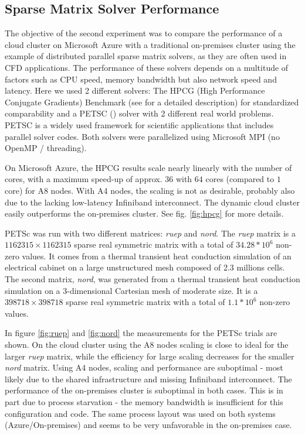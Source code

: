 \documentclass[3p,times]{elsarticle}
\begin{document}
\subsection{Sparse Matrix Solver Performance}
The objective of the second experiment was to compare the performance of a cloud cluster on Microsoft Azure with a traditional on-premises cluster using the example of distributed parallel sparse matrix solvers, as they are often used in CFD applications. The performance of these solvers depends on a multitude of factors such as CPU speed, memory bandwidth but also network speed and latency. Here we used 2 different solvers: The HPCG (High Performance Conjugate Gradients) Benchmark (see \cite{hpcg} for a detailed description) for standardized comparability and a PETSC (\cite{petsc-web-page}) solver with 2 different real world problems. PETSC is a widely used framework for scientific applications that includes parallel solver codes.
Both solvers were parallelized using Microsoft MPI (no OpenMP / threading).

On Microsoft Azure, the HPCG results scale nearly linearly with the number of cores, with a maximum speed-up of approx. $36$ with $64$ cores (compared to $1$ core) for A8 nodes. With A4 nodes, the scaling is not as desirable, probably also due to the lacking low-latency Infiniband interconnect. The dynamic cloud cluster easily outperforms the on-premises cluster. See fig. \ref{fig:hpcg} for more details.

PETSc was run with two different matrices: \textit{ruep} and \textit{nord}. The \textit{ruep} matrix is a $1162315 \times 1162315$ sparse real symmetric matrix with a total of $34.28*10^{6}$ non-zero values. It comes from a thermal transient heat conduction simulation of an electrical cabinet on a large unstructured mesh composed of 2.3 millions cells. The second matrix, \textit{nord}, was generated from a thermal transient heat conduction simulation on a 3-dimensional Cartesian mesh of moderate size. It is a $398718 \times 398718$ sparse real symmetric matrix with a total of $1.1*10^{6}$ non-zero values.



In figure \ref{fig:ruep} and \ref{fig:nord} the measurements for the PETSc trials are shown. On the cloud cluster using the A8 nodes scaling is close to ideal for the larger \textit{ruep} matrix, while the efficiency for large scaling decreases for the smaller \textit{nord} matrix. Using A4 nodes, scaling and performance are suboptimal - most likely due to the shared infrastructure and missing Infiniband interconnect.  The performance of the on-premises cluster is suboptimal in both cases. This is in part due to process starvation - the memory bandwidth is insufficient for this configuration and code. The same process layout was used on both systems (Azure/On-premises) and seems to be very unfavorable in the on-premises case.
\end{document}

